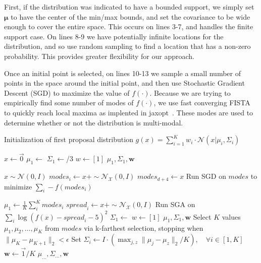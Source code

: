 \documentclass{ecai}  %
\begin{document}
First, if the distribution was indicated to have a bounded support, we simply set $\bm{\mu}$ to have the center of the min/max bounds, and set the covariance to be wide enough to cover the entire space. This occurs on lines 3-7, and handles the finite support case. 
%
On lines 8-9 we have potentially infinite locations for the distribution, and so use random sampling to find a location that has a non-zero probability. This provides greater flexibility for our approach. 

Once an initial point is selected, on lines 10-13 we sample a small number of points in the space around the initial point, and then use Stochastic Gradient Descent (SGD) to maximize the value of $f(\cdot)$. Because we are trying to empirically find some number of modes of $f(\cdot)$, we use fast converging FISTA~\cite{BECK2003167} to quickly reach local maxima as implented in jaxopt~\cite{Blondel2021a}. These modes are used to determine whether or not the distribution is multi-modal. 

%
%
%
\begin{algorithm}[H]
\caption{Initialization of first proposal distribution $g(x) = \sum_{i=1}^K w_i \cdot \mathcal{N}(x | \mu_i, \Sigma_i) $}  \label{algo:init}
\begin{algorithmic}[1]
    \State $x \gets \vec{0}$ 
        \State $\mu_1 \gets $ 
        \State $\Sigma_1 \gets $/3 
        \State $w \gets [1]$ 
        \State \Return $\mu_1, \Sigma_1, \bm{w}$
    \EndIf

      
        \State $x \sim \mathcal{N}(0, I)$
    \EndWhile  
        \State $\mathit{modes}_i \gets x + \sim \mathcal{N}_\mathcal{X}(0, I)$
        \State $\mathit{modes}_{d+4} \gets x$
    \EndFor
    \State Run SGD on $\mathit{modes}$ to minimize $\sum_i -f(\mathit{modes}_i)$
    
     
        \State $\mu_1 \gets \frac{1}{K}\sum_i^K \mathit{modes}_i$
            \State $\mathit{spread}_i \gets x + \sim \mathcal{N}_\mathcal{X}(0, I)$
        \EndFor
        \State Run SGA on $\sum_{i} \log\left(f(x)-\mathit{spread}_i-5\right)^2$
        \State $\Sigma_1 \gets $
        \State $w \gets [1]$
        \State \Return $\mu_1, \Sigma_1, \bm{w}$
    \Else {}
        \State Select $K$ values $\mu_1, \mu_2, \ldots, \mu_K$ from $\mathit{modes}$ via k-farthest selection, stopping when $\|\mu_{K} - \mu_{K+1}\|_2 < \epsilon$
        \State Set $\Sigma_i \gets I\cdot(\max_{j,z} \|\mu_j-\mu_z\|_2/K), \quad \forall i \in [1, K]$
        \State $\bm{w} \gets \vec{1}/K$
        \State \Return $\mu_{\ldots}, \Sigma_{\ldots}, \bm{w}$
    \EndIf
\EndProcedure
\end{algorithmic}
\end{algorithm}
%
%
\end{document}
